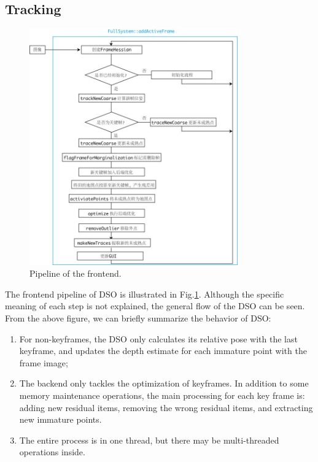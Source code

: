 \documentclass[a4paper,10pt]{article}
\begin{document}
	\subsection{Tracking}
	\begin{figure}[!thp]
	\centering
	\label{fig:frontend-dso}
	\includegraphics[width=0.8\textwidth]{figs/frontend-cn.jpg}
	\caption{Pipeline of the frontend.}
	\end{figure}
	The frontend pipeline of DSO is illustrated in Fig.\ref{fig:frontend-dso}. Although the specific meaning of each step is not explained, the general flow of the DSO can be seen. From the above figure, we can briefly summarize the behavior of DSO:
	
	\begin{enumerate}
		\item For non-keyframes, the DSO only calculates its relative pose with the last keyframe, and updates the depth estimate for each immature point with the frame image;
		\item The backend only tackles the optimization of keyframes. In addition to some memory maintenance operations, the main processing for each key frame is: adding new residual items, removing the wrong residual items, and extracting new immature points.
		\item The entire process is in one thread, but there may be multi-threaded operations inside.
	\end{enumerate}
	
\end{document}
